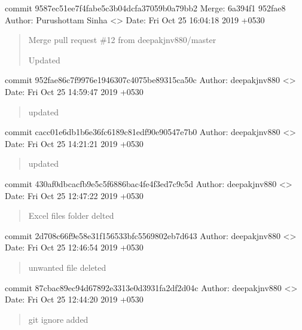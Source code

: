 \documentclass[letterpaper,10pt,english]{sphinxmanual}
\begin{document}
commit 9587ec51ee7f4fabe5c3b04dcfa37059b0a79bb2
Merge: 6a394f1 952fae8
Author: Purushottam Sinha \textless{}\textgreater{}
Date:   Fri Oct 25 16:04:18 2019 +0530
\begin{quote}

Merge pull request \#12 from deepakjnv880/master

Updated
\end{quote}

commit 952fae86c7f9976e1946307c4075be89315ca50c
Author: deepakjnv880 \textless{}\textgreater{}
Date:   Fri Oct 25 14:59:47 2019 +0530
\begin{quote}

updated
\end{quote}

commit cacc01e6db1b6e36fc6189c81edf90e90547e7b0
Author: deepakjnv880 \textless{}\textgreater{}
Date:   Fri Oct 25 14:21:21 2019 +0530
\begin{quote}

updated
\end{quote}

commit 430af0dbcacfb9e5c5f6886bac4fe4f3ed7c9c5d
Author: deepakjnv880 \textless{}\textgreater{}
Date:   Fri Oct 25 12:47:22 2019 +0530
\begin{quote}

Excel files folder delted
\end{quote}

commit 2d708c66f9e58e31f156533bfc5569802eb7d643
Author: deepakjnv880 \textless{}\textgreater{}
Date:   Fri Oct 25 12:46:54 2019 +0530
\begin{quote}

unwanted file deleted
\end{quote}

commit 87cbac89ec94d67892e3313e0d3931fa2df2d04c
Author: deepakjnv880 \textless{}\textgreater{}
Date:   Fri Oct 25 12:44:20 2019 +0530
\begin{quote}

git ignore added
\end{quote}
\end{document}
